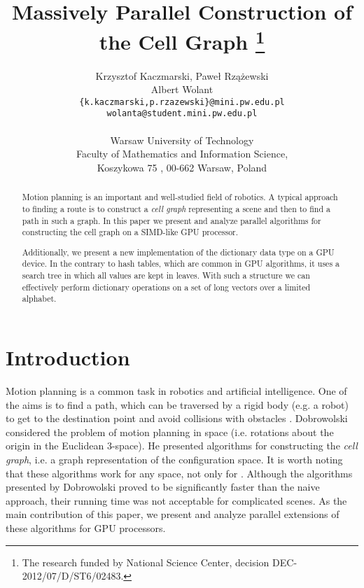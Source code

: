 \documentclass[a4paper]{article}
\begin{document}
\title{Massively Parallel Construction of the Cell Graph
\footnote{The research funded by National Science Center, decision  DEC-2012/07/D/ST6/02483.}
}

\author{
Krzysztof Kaczmarski, Pawe{\l} Rz{\k a}{\. z}ewski  \\
Albert Wolant\\
\texttt{\{k.kaczmarski,p.rzazewski\}@mini.pw.edu.pl} \\
\texttt{wolanta@student.mini.pw.edu.pl} \\ \\
Warsaw University of Technology \\
Faculty of Mathematics and Information Science,\\
Koszykowa 75 , 00-662 Warsaw, Poland
}
\date{ }
\maketitle


\begin{abstract}
Motion planning is an important and well-studied field of robotics. A typical approach to finding a route is to construct a {\em cell graph} representing a scene and then to find a path in such a graph. 
In this paper we present and analyze parallel algorithms for constructing the cell graph on a SIMD-like GPU processor.

Additionally, we present a new implementation of the dictionary data type on a GPU device. In the contrary to hash tables, which are common in GPU algorithms, it uses a search tree in which all values are kept in leaves. With such a structure we can effectively perform dictionary operations on a set of long vectors over a limited alphabet.
\end{abstract}


\maketitle


\section{Introduction}

Motion planning is a common task in robotics and artificial intelligence. One of the aims is to find a path, which can be traversed by a rigid body (e.g. a robot) to get to the destination point and avoid collisions with obstacles \cite{Hwang}.
Dobrowolski \cite{DBLP:conf/sii/Dobrowolski13} considered the problem of motion planning in  space (i.e. rotations about the origin in the Euclidean 3-space). He presented algorithms for constructing the {\em cell graph}, i.e. a graph representation of the configuration space. It is worth noting that these algorithms work for any space, not only for . 
Although the algorithms presented by Dobrowolski proved to be significantly faster than the naive approach, their running time was not acceptable for complicated scenes. As the main contribution of this paper, we present and analyze parallel extensions of these algorithms for GPU processors. 
\end{document}

